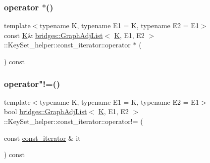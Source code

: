 \subsubsection{\texorpdfstring{operator $\ast$()}{operator *()}}
{\footnotesize\ttfamily template$<$typename K, typename E1 = K, typename E2 = E1$>$ \\
const \mbox{\hyperlink{namespacebridges_acfb0a4f7877d8f63de3e6862004c50edaa5f3c6a11b03839d46af9fb43c97c188}{K}}\& \mbox{\hyperlink{classbridges_1_1_graph_adj_list}{bridges\+::\+Graph\+Adj\+List}}$<$ \mbox{\hyperlink{namespacebridges_acfb0a4f7877d8f63de3e6862004c50edaa5f3c6a11b03839d46af9fb43c97c188}{K}}, E1, E2 $>$\+::Key\+Set\+\_\+helper\+::const\+\_\+iterator\+::operator $\ast$ (\begin{DoxyParamCaption}{ }\end{DoxyParamCaption}) const\hspace{0.3cm}{\ttfamily [inline]}}

\mbox{\label{classbridges_1_1_graph_adj_list_1_1_key_set__helper_1_1const__iterator_a519b936d0ce2ff34c587a43b1a3e7a62}} 
\subsubsection{\texorpdfstring{operator"!=()}{operator!=()}}
{\footnotesize\ttfamily template$<$typename K, typename E1 = K, typename E2 = E1$>$ \\
bool \mbox{\hyperlink{classbridges_1_1_graph_adj_list}{bridges\+::\+Graph\+Adj\+List}}$<$ \mbox{\hyperlink{namespacebridges_acfb0a4f7877d8f63de3e6862004c50edaa5f3c6a11b03839d46af9fb43c97c188}{K}}, E1, E2 $>$\+::Key\+Set\+\_\+helper\+::const\+\_\+iterator\+::operator!= (\begin{DoxyParamCaption}\item[{const \mbox{\hyperlink{classbridges_1_1_graph_adj_list_1_1_key_set__helper_1_1const__iterator}{const\+\_\+iterator}} \&}]{it }\end{DoxyParamCaption}) const\hspace{0.3cm}{\ttfamily [inline]}}

